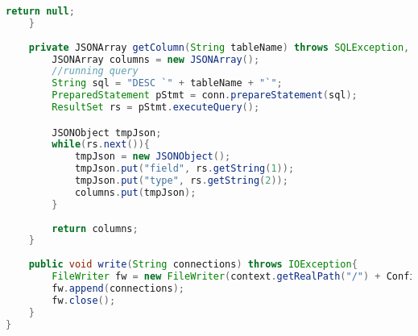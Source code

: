 \begin{lstlisting}[language=Java,basicstyle=\tiny,caption=ConnectionReaderWriter.java]
        return null;
    }
    
    private JSONArray getColumn(String tableName) throws SQLException, JSONException{
        JSONArray columns = new JSONArray();
        //running query
        String sql = "DESC `" + tableName + "`";
        PreparedStatement pStmt = conn.prepareStatement(sql);
        ResultSet rs = pStmt.executeQuery();

        JSONObject tmpJson;
        while(rs.next()){
            tmpJson = new JSONObject();
            tmpJson.put("field", rs.getString(1));
            tmpJson.put("type", rs.getString(2));
            columns.put(tmpJson);
        }
        
        return columns;
    }
    
    public void write(String connections) throws IOException{
        FileWriter fw = new FileWriter(context.getRealPath("/") + Config.connectionFile);
        fw.append(connections);
        fw.close();
    }
}
\end{lstlisting}
